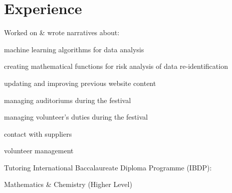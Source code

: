 \documentclass[letterpaper]{deedy-resume} %
\begin{document}
\begin{minipage}[t]{0.66\textwidth}
\sectionspace %


\section{Experience}


Worked on \& wrote narratives about:
\sectionspace
\begin{tightitemize}
\item machine learning algorithms for data analysis
\item creating mathematical functions for risk analysis of data re-identification
\end{tightitemize}

\sectionspace %




\begin{tightitemize}
\item updating and improving previous website content
\item managing auditoriums during the festival
\item managing volunteer's duties during the festival
\end{tightitemize}
\sectionspace %

\begin{tightitemize}
\item contact with suppliers
\item volunteer management
\end{tightitemize}
\sectionspace


Tutoring International Baccalaureate Diploma Programme (IBDP):
\begin{tightitemize}
\item Mathematics & Chemistry (Higher Level)
\end{tightitemize}



\end{minipage} %
\end{document}
